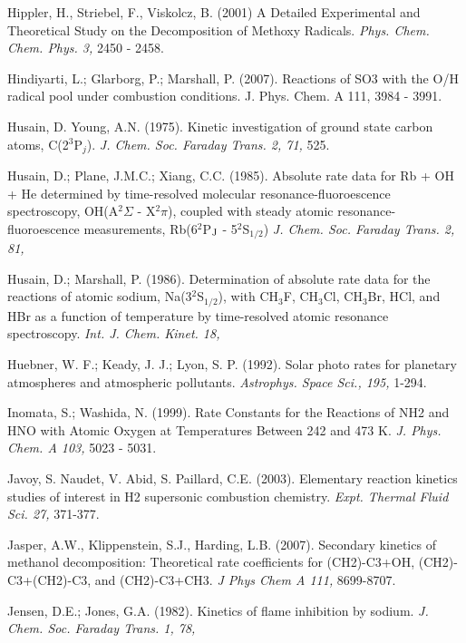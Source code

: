 \documentclass[12pt,landscape]{article}
\newcounter{reaction}
\newcounter{photo}
\begin{document}
Hippler, H., Striebel, F., Viskolcz, B. (2001) A Detailed Experimental and Theoretical Study on the Decomposition of Methoxy Radicals.  {\em Phys. Chem. Chem. Phys.  3,} 2450 - 2458.

Hindiyarti, L.; Glarborg, P.; Marshall, P. (2007).  Reactions of SO3 with the O/H radical pool under combustion conditions.   J. Phys. Chem. A 111, 3984 - 3991.

Husain, D. Young, A.N. (1975). Kinetic investigation of ground state carbon atoms, C(2$^3$P$_j$).  {\em J. Chem. Soc. Faraday Trans. 2, 71,} 525.

Husain, D.; Plane, J.M.C.; Xiang, C.C. (1985).  Absolute rate data for Rb + OH + He determined by time-resolved molecular resonance-fluoroescence spectroscopy, OH(A$^2\Sigma$ - X$^2\pi$), coupled with steady atomic resonance-fluoroescence measurements, Rb(6$^2$P$_{\rm J}$ - 5$^2$S$_{1/2}$) {\em J. Chem. Soc. Faraday Trans. 2, 81,}

Husain, D.; Marshall, P. (1986). Determination of absolute rate data for the reactions of atomic sodium, Na(3$^2$S$_{1/2}$), with CH$_3$F, CH$_3$Cl, CH$_3$Br, HCl, and HBr as a function of temperature by time-resolved atomic resonance spectroscopy. {\em Int. J. Chem. Kinet. 18,}

Huebner, W. F.; Keady, J. J.; Lyon, S. P. (1992). Solar photo rates for planetary atmospheres and atmospheric pollutants.  {\em Astrophys. Space Sci., 195,} 1-294.

Inomata, S.; Washida, N.  (1999). Rate Constants for the Reactions of NH2 and HNO with Atomic Oxygen at Temperatures Between 242 and 473 K. {\em  J. Phys. Chem. A 103,} 5023 - 5031.

Javoy, S. Naudet, V. Abid, S. Paillard, C.E. (2003).  Elementary reaction kinetics studies of interest in H2 supersonic combustion chemistry.  {\em Expt. Thermal Fluid Sci. 27,}  371-377.

Jasper, A.W., Klippenstein, S.J., Harding, L.B.  (2007). Secondary kinetics of methanol decomposition: Theoretical rate coefficients for (CH2)-C3+OH, (CH2)-C3+(CH2)-C3, and (CH2)-C3+CH3. {\em J Phys Chem A 111,} 8699-8707.

Jensen, D.E.; Jones, G.A. (1982). Kinetics of flame inhibition by sodium. {\em J. Chem. Soc. Faraday Trans. 1, 78,}
\end{document}
